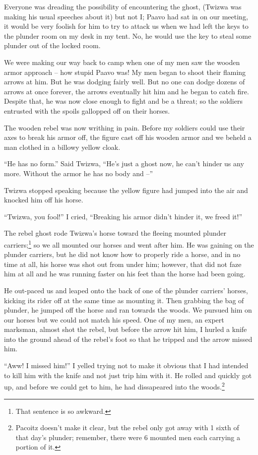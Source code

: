 Everyone was dreading the possibility of encountering the ghost, (Twizwa was making his usual speeches about it) but not I; Paavo had sat in on our meeting, it would be very foolish for him to try to attack us when we had left the keys to the plunder room on my desk in my tent. No, he would use the key to steal some plunder out of the locked room.

We were making our way back to camp when one of my men saw the wooden armor approach -- how stupid Paavo was! My men began to shoot their flaming arrows at him. But he was dodging fairly well. But no one can dodge dozens of arrows at once forever, the arrows eventually hit him and he began to catch fire. Despite that, he was now close enough to fight and be a threat; so the soldiers entrusted with the spoils gallopped off on their horses.

The wooden rebel was now writhing in pain. Before my soldiers could use their axes to break his armor off, the figure cast off his wooden armor and we beheld a man clothed in a billowy yellow cloak.

``He has no form.'' Said Twizwa, ``He's just a ghost now, he can't hinder us any more. Without the armor he has no body and --''

Twizwa stopped speaking because the yellow figure had jumped into the air and knocked him off his horse.

``Twizwa, you fool!'' I cried, ``Breaking his armor didn't hinder it, we freed it!''

The rebel ghost rode Twizwa's horse toward the fleeing mounted plunder carriers;\footnote{That sentence is so awkward.} so we all mounted our horses and went after him. He was gaining on the plunder carriers, but he did not know how to properly ride a horse, and in no time at all, his horse was shot out from under him; however, that did not faze him at all and he was running faster on his feet than the horse had been going.

He out-paced us and leaped onto the back of one of the plunder carriers' horses, kicking its rider off at the same time as mounting it. Then grabbing the bag of plunder, he jumped off the horse and ran towards the woods. We pursued him on our horses but we could not match his speed. One of my men, an expert marksman, almost shot the rebel, but before the arrow hit him, I hurled a knife into the ground ahead of the rebel's foot so that he tripped and the arrow missed him.

``Aww! I missed him!'' I yelled trying not to make it obvious that I had intended to kill him with the knife and not just trip him with it. He rolled and quickly got up, and before we could get to him, he had dissapeared into the woods.\footnote{Pacoitz doesn't make it clear, but the rebel only got away with 1 sixth of that day's plunder; remember, there were 6 mounted men each carrying a portion of it.} 

